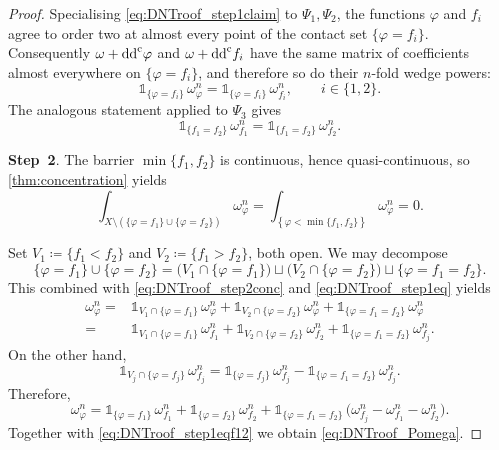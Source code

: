 \begin{proof}
Specialising \eqref{eq:DNTroof_step1claim} to $\Psi_1,\Psi_2$, the functions $\varphi$ and $f_i$ agree to order two at almost every point of the contact set $\{\varphi=f_i\}$. Consequently $\omega+\mathrm{dd}^{\mathrm{c}} \varphi$ and $\omega+\mathrm{dd}^{\mathrm{c}} f_i$ have the same matrix of coefficients almost everywhere on $\{\varphi=f_i\}$, and therefore so do their $n$-fold wedge powers:
\begin{equation}\label{eq:DNTroof_step1eq}
\mathds{1}_{\{\varphi=f_i\}}\,\omega^n_\varphi = \mathds{1}_{\{\varphi=f_i\}}\,\omega^n_{f_i},\qquad i\in\{1,2\}.
\end{equation}
The analogous statement applied to $\Psi_3$ gives
\begin{equation}\label{eq:DNTroof_step1eqf12}
\mathds{1}_{\{f_1=f_2\}}\,\omega^n_{f_1} = \mathds{1}_{\{f_1=f_2\}}\,\omega^n_{f_2}.
\end{equation}

\textbf{Step~2}. The barrier $\min\{f_1,f_2\}$ is continuous, hence quasi-continuous, so \cref{thm:concentration} yields
\begin{equation}\label{eq:DNTroof_step2conc}
\int_{X\setminus \left(\{\varphi=f_1\}\cup\{\varphi=f_2\}\right)}\omega^n_\varphi
=
\int_{\left\{\varphi<\min\{f_1,f_2\}\right\}}\omega^n_\varphi
=0.
\end{equation}

Set $V_1\coloneqq \{f_1<f_2\}$ and $V_2\coloneqq \{f_1>f_2\}$, both open. We may decompose
\[
\{\varphi=f_1\}\cup\{\varphi=f_2\}
=
\bigl(V_1\cap\{\varphi=f_1\}\bigr)
\sqcup
\bigl(V_2\cap\{\varphi=f_2\}\bigr)
\sqcup
\{\varphi=f_1=f_2\}.
\]
This combined with \eqref{eq:DNTroof_step2conc} and \eqref{eq:DNTroof_step1eq} yields
\[
\begin{aligned}
\omega^n_\varphi
={}&
\mathds{1}_{V_1\cap\{\varphi=f_1\}}\,\omega^n_\varphi
+
\mathds{1}_{V_2\cap\{\varphi=f_2\}}\,\omega^n_\varphi
+
\mathds{1}_{\{\varphi=f_1=f_2\}}\,\omega^n_\varphi
\\
={}&
\mathds{1}_{V_1\cap\{\varphi=f_1\}}\,\omega^n_{f_1}
+
\mathds{1}_{V_2\cap\{\varphi=f_2\}}\,\omega^n_{f_2}
+
\mathds{1}_{\{\varphi=f_1=f_2\}}\,\omega^n_{f_j}.
\end{aligned}
\]
On the other hand,
\[
\mathds{1}_{V_j\cap\{\varphi=f_j\}}\,\omega^n_{f_j}
=
\mathds{1}_{\{\varphi=f_j\}}\,\omega^n_{f_j}
-
\mathds{1}_{\{\varphi=f_1=f_2\}}\,\omega^n_{f_j}.
\]
Therefore,
\[
\omega^n_\varphi
=
\mathds{1}_{\{\varphi=f_1\}}\,\omega^n_{f_1}
+
\mathds{1}_{\{\varphi=f_2\}}\,\omega^n_{f_2}
+
\mathds{1}_{\{\varphi=f_1=f_2\}}
\,\bigl(\omega^n_{f_j}-\omega^n_{f_1}-\omega^n_{f_2}\bigr).
\]
Together with \eqref{eq:DNTroof_step1eqf12} we obtain \eqref{eq:DNTroof_Pomega}.
\end{proof}

